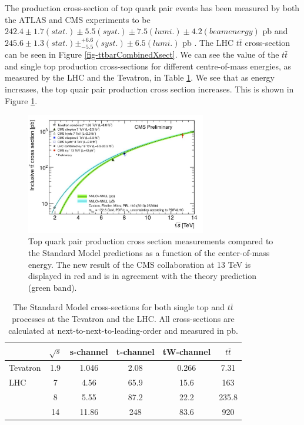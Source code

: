 The production cross-section of top quark pair events has been measured by both the ATLAS and CMS experiments to be $242.4 \pm 1.7(stat.) \pm 5.5(syst.) \pm 7.5(lumi.) \pm 4.2(beam energy)$ pb \cite{Aad:2014kva} and $245.6 \pm 1.3(stat.) \pm_{-5.5}^{+6.6}(syst.) \pm 6.5(lumi.)$ pb \cite{Khachatryan:2016mqs}. The LHC $t\bar{t}$ cross-section can be seen in Figure \ref{fig-ttbarCombinedXsect}. We can see the value of the $t\bar{t}$ and single top production cross-sections for different centre-of-mass energies, as measured by the LHC and the Tevatron, in Table \ref{tab-ttbarcrosssections}. We see that as energy increases, the top quair pair production cross section increases. This is shown in Figure \ref{fig-ttbarXsectPlot}.

\begin{figure}
\begin{center}
\includegraphics[width=0.7\textwidth]{Figures/ttbarXsectPlot.png}
\end{center}
\caption{Top quark pair production cross section measurements compared to the Standard Model predictions as a function of the center-of-mass energy. The new result of the CMS collaboration at 13 TeV is displayed in red and is in agreement with the theory prediction (green band). \cite{ttbarXsectPlot}}
\label{fig-ttbarXsectPlot}
\end{figure}

\begin{table}
\begin{center}
\begin{tabular}{lccccc}
\hline
\hline
& \textbf{$\sqrt{s}$} & \textbf{s-channel} & \textbf{t-channel} & \textbf{tW-channel} & \textbf{$t\bar{t}$} \\
\hline
Tevatron & 1.9 & 1.046 & 2.08 & 0.266 & 7.31 \\
LHC & 7 & 4.56 & 65.9 & 15.6 & 163 \\ 
 & 8 & 5.55 & 87.2 & 22.2 & 235.8 \\
 & 14 & 11.86 & 248 & 83.6 & 920 \\
\hline
\hline
\end{tabular}
\end{center}
\caption{The Standard Model cross-sections for both single top and $t\bar{t}$ processes at the Tevatron and the LHC. All cross-sections are calculated at next-to-next-to-leading-order and measured in pb. \cite{Czakon:2013goa}}
\label{tab-ttbarcrosssections}
\end{table}

